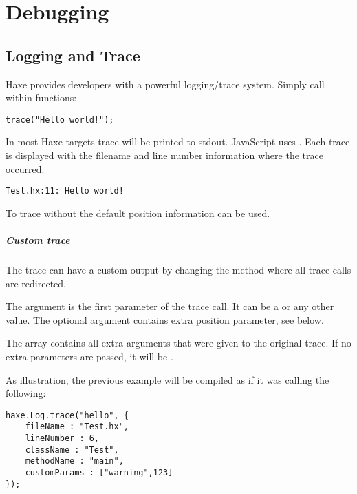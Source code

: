 \chapter{Debugging}
\label{debugging}

\section{Logging and Trace}
\label{debugging-trace-log}

Haxe provides developers with a powerful logging/trace system. Simply call  within functions:

\begin{lstlisting}
trace("Hello world!");
\end{lstlisting}

In most Haxe targets trace will be printed to stdout. JavaScript uses . Each trace is displayed with the filename and line number information where the trace occurred:

\begin{lstlisting}
Test.hx:11: Hello world!
\end{lstlisting}

To trace without the default position information  can be used.

\paragraph{Custom trace}

The trace can have a custom output by changing the  method where all trace calls are redirected. 


The  argument is the first parameter of the trace call. It can be a  or any other value. The optional  argument contains extra position parameter, see below.

The  array contains all extra arguments that were given to the original trace. If no extra parameters are passed, it will be . 

As illustration, the previous example will be compiled as if it was calling the following:

\begin{lstlisting}
haxe.Log.trace("hello", {
	fileName : "Test.hx", 
	lineNumber : 6, 
	className : "Test", 
	methodName : "main", 
	customParams : ["warning",123]
});
\end{lstlisting}

